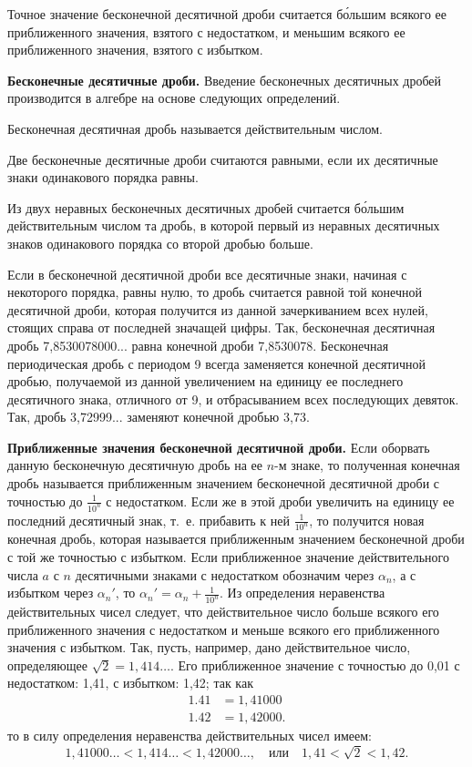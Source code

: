 \documentclass[oneside]{book}
\begin{document}
Точное значение бесконечной десятичной дроби считается б\'{о}льшим всякого ее приближенного значения, взятого с недостатком, и меньшим всякого ее приближенного значения, взятого с избытком.

\textbf{Бесконечные десятичные дроби.}
Введение бесконечных десятичных дробей производится в алгебре на основе следующих определений.

Бесконечная десятичная дробь называется действительным числом.

Две бесконечные десятичные дроби считаются равными, если их десятичные знаки одинакового порядка равны.

Из двух неравных бесконечных десятичных дробей считается б\'{о}льшим действительным числом та дробь, в которой первый из неравных десятичных знаков одинакового порядка со второй дробью больше.

Если в бесконечной десятичной дроби все десятичные знаки, начиная с некоторого порядка, равны нулю, то дробь считается равной той конечной десятичной дроби, которая получится из данной зачеркиванием всех нулей, стоящих справа от последней значащей цифры.
Так, бесконечная десятичная дробь 7,8530078000...
равна конечной дроби 7,8530078.
Бесконечная периодическая дробь с периодом 9 всегда заменяется конечной десятичной дробью, получаемой из данной увеличением на единицу ее последнего десятичного знака, отличного от 9, и отбрасыванием всех последующих девяток.
Так, дробь 3,72999...
заменяют конечной дробью 3,73.

\textbf{Приближенные значения бесконечной десятичной дроби.}
Если оборвать данную бесконечную десятичную дробь на ее $n$-м знаке, то полученная конечная дробь называется приближенным значением бесконечной десятичной дроби с точностью до $\tfrac1{10^n}$ с недостатком.
Если же в этой дроби увеличить на единицу ее последний десятичный знак, т.~е.
прибавить к ней $\tfrac1{10^n}$, то получится новая конечная дробь, которая называется приближенным значением бесконечной дроби с той же точностью с избытком.
Если приближенное значение действительного числа $a$ с $n$ десятичными знаками с недостатком обозначим через $\alpha_n$, а с избытком через  $\alpha_n'$, то  $\alpha_n'=\alpha_n+\tfrac1{10^n}$.
Из определения неравенства действительных чисел следует, что действительное число больше всякого его приближенного значения с недостатком и меньше всякого его приближенного значения с избытком.
Так, пусть, например, дано действительное число, определяющее  $\sqrt{2}  = 1{,}414\dots$.
Его приближенное значение с точностью до 0,01 с недостатком:
1,41, с избытком:
1,42;
так как
\begin{align*}
1.41 &= 1{,}41000
\\
1.42 &= 1{,}42000.
\end{align*}
то в силу определения неравенства действительных чисел имеем:
\[1,41000\ldots
< 1,414\ldots
< 1,42000\ldots,
\quad\text{или}\quad
1,41 <  \sqrt{2}  < 1,42.\]
\end{document}
